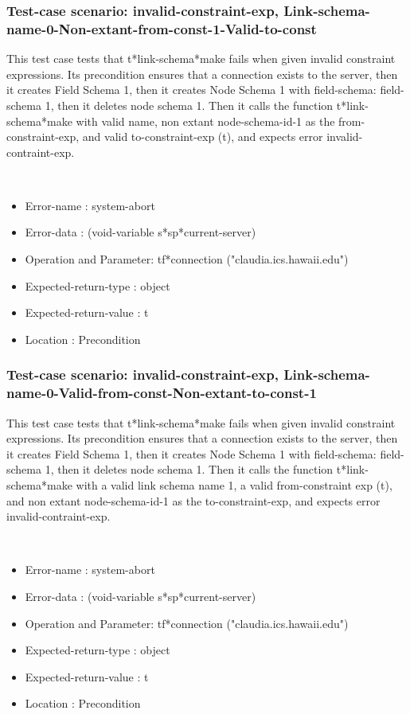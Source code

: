 \subsubsection {Test-case scenario: invalid-constraint-exp, Link-schema-name-0-Non-extant-from-const-1-Valid-to-const}


This test case tests that t*link-schema*make fails when given invalid constraint expressions.
Its precondition ensures that a connection exists to the server, then it creates Field Schema 1, then it creates Node Schema 1 with field-schema: field-schema 1, then it deletes node schema 1.
Then it calls the function t*link-schema*make  with valid name, non extant node-schema-id-1 as the from-constraint-exp, and valid to-constraint-exp (t), and expects error invalid-contraint-exp.



\
\begin {itemize}
\item 	Error-name             : system-abort
\item Error-data             : (void-variable s*sp*current-server)
\item Operation and Parameter: tf*connection ("claudia.ics.hawaii.edu")
\item Expected-return-type   : object
\item Expected-return-value  : t
\item Location               : Precondition



\end {itemize}
\subsubsection {Test-case scenario: invalid-constraint-exp, Link-schema-name-0-Valid-from-const-Non-extant-to-const-1}


This test case tests that t*link-schema*make fails when given invalid constraint expressions.
Its precondition ensures that a connection exists to the server, then it creates Field Schema 1, then it creates Node Schema 1 with field-schema: field-schema 1, then it deletes node schema 1.
Then it calls the function t*link-schema*make  with a valid link schema name 1, a valid from-constraint exp (t), and non extant node-schema-id-1 as the to-constraint-exp, and expects error invalid-contraint-exp.



\
\begin {itemize}
\item 	Error-name             : system-abort
\item Error-data             : (void-variable s*sp*current-server)
\item Operation and Parameter: tf*connection ("claudia.ics.hawaii.edu")
\item Expected-return-type   : object
\item Expected-return-value  : t
\item Location               : Precondition



\end {itemize}
